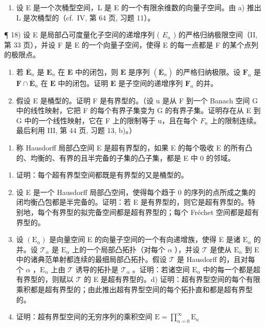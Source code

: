\begin{enumerate}
\def\labelenumi{\alph{enumi})}
\setcounter{enumi}{1}
\tightlist
\item
  设 E 是一个次桶型空间，L 是 E 的一个有限余维数的向量子空间。由 a) 推出 L 是次桶型的（cf.~IV, 第 64 页, 习题 11）。
\end{enumerate}

¶ 18) 设 E 是局部凸可度量化子空间的递增序列 ( \(E_{n}\) ) 的严格归纳极限空间（II, 第 33 页），并设 F 是 E 的一个向量子空间，使得 E 的每一点都是 F 的某个点列的极限点。

\begin{enumerate}
\def\labelenumi{\alph{enumi})}
\item
  若 \(\overline{\mathbf{E}}_n\) 是 \(\mathbf{E}_n\) 在 \(\mathbf{E}\) 中的闭包，则 \(\mathbf{E}\) 是序列 \((\overline{\mathbf{E}}_n)\) 的严格归纳极限。设 \(\mathbf{F}_n\) 是 \(\mathbf{F} \cap \overline{\mathbf{E}}_n\) 在 \(\mathbf{E}\) 中的闭包。证明 \(\mathbf{E}\) 是子空间的递增序列 \(\mathbf{F}_n\) 的并。
\item
  假设 E 是桶型的。证明 F 是有界型的。（设 u 是从 F 到一个 Banach 空间 G 中的线性映射，它把 F 的每个有界子集变为 G 的有界子集。证明存在从 E 到 G 中的一个线性映射，它在 F 上的限制等于 u，且在每个 \(F_{n}\) 上的限制连续。最后利用 III, 第 44 页, 习题 13, b)。）
\end{enumerate}

\begin{enumerate}
\def\labelenumi{\arabic{enumi})}
\setcounter{enumi}{18}
\tightlist
\item
  称 Hausdorff 局部凸空间 E 是超有界型的，如果 E 的每个吸收 E 的所有凸的、均衡的、有界的且半完备的子集的凸子集，都是 E 中 0 的邻域。
\end{enumerate}

\begin{enumerate}
\def\labelenumi{\alph{enumi})}
\item
  证明：每个超有界型空间都既是有界型的又是桶型的。
\item
  设 E 是一个 Hausdorff 局部凸空间，使得每个趋于 0 的序列的点所成之集的闭均衡凸包都是半完备的。证明：若 E 是有界型的，则它是超有界型的。特别地，每个有界型的拟完备空间都是超有界型的；每个 Fréchet 空间都是超有界型的。
\item
  设 \((\mathrm{E}_{\alpha})\) 是向量空间 E 的向量子空间的一个有向递增族，使得 E 是诸 \(\mathrm{E}_{\alpha}\) 的并。设 \(\mathcal{T}_{\alpha}\) 是 \(\mathrm{E}_{\alpha}\) 上的一个局部凸拓扑（对每个 \(\alpha\) ），并设 \(\mathcal{T}\) 是使从 \(\mathrm{E}_{\alpha}\) 到 E 中的诸典范单射都连续的最细局部凸拓扑。假设 \(\mathcal{T}\) 是 Hausdorff 的，且对每个 \(\alpha\) ，\(\mathrm{E}_{\alpha}\) 上由 \(\mathcal{T}\) 诱导的拓扑是 \(\mathcal{T}_{\alpha}\) 。证明：若诸空间 \(\mathrm{E}_{\alpha}\) 中的每一个都是超有界型的，则赋以 \(\mathcal{T}\) 的 E 是超有界型的。d) 证明：超有界型空间的每个有限乘积都是超有界型的；由此推出超有界型空间的每个拓扑直和都是超有界型的。
\item
  证明：超有界型空间的无穷序列的乘积空间 \(\mathrm{E} = \prod_{n=0}^{\infty} \mathrm{E}_n\)
\end{enumerate}

